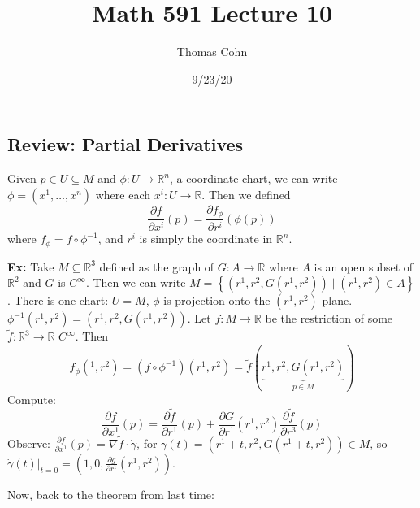 \documentclass[10pt,letterpaper]{article}
\author{Thomas Cohn}
\title{Math 591 Lecture 10}
\date{9/23/20} %
\newcommand{\n}{\hfill\break}
\newcommand{\nn}{\vspace{0.5\baselineskip}\n}
\newcommand{\hangblock}[2]{\par\noindent\settowidth{\hangindent}{\textbf{#1: }}\textbf{#1: }\!\!\!#2}
\newcommand{\ex}[1]{\hangblock{Ex}{#1}}
\newcommand{\set}[1]{\left\{#1\right\}}
\newcommand{\reals}{\mathbb{R}}
\newcommand{\R}{\reals}
\newcommand{\inv}{^{-1}}
\newcommand{\of}{\circ}
\newcommand{\restr}[2]{\left.#1\right|_{#2}}
\newcommand{\pd}[2]{\frac{\partial{}#1}{\partial{}#2}}
\newcommand{\del}{\nabla}
\begin{document}
\maketitle
\setlength\RaggedRightParindent{\parindent}
\RaggedRight

\subsection*{Review: Partial Derivatives}

\par\noindent
Given $p\in{}U\subseteq{}M$ and $\phi:U\to\R^{n}$, a coordinate chart, we can write $\phi=(x^{1},\ldots,x^{n})$ where each $x^{i}:U\to\R$. Then we defined
\[
	\pd{f}{x^{i}}(p)=\pd{f_{\phi}}{r^{i}}(\phi(p))
\]
where $f_{\phi}=f\of\phi\inv$, and $r^{i}$ is simply the coordinate in $\R^{n}$.\n

\ex{
	Take $M\subseteq\R^{3}$ defined as the graph of $G:A\to\R$ where $A$ is an open subset of $\R^{2}$ and $G$ is $C^{\infty}$. Then we can write $M=\set{(r^{1},r^{2},G(r^{1},r^{2}))\mid{}(r^{1},r^{2})\in{}A}$. There is one chart: $U=M$, $\phi$ is projection onto the $(r^{1},r^{2})$ plane. $\phi\inv(r^{1},r^{2})=(r^{1},r^{2},G(r^{1},r^{2}))$.\nn
	Let $f:M\to\R$ be the restriction of some $\tilde{f}:\R^{3}\to\R$ $C^{\infty}$. Then
	\[
		f_{\phi}(^{1},r^{2})=(f\of\phi\inv)(r^{1},r^{2})=\tilde{f}(\underbrace{r^{1},r^{2},G(r^{1},r^{2})}_{p\in{}M})
	\]
	Compute:
	\[
		\pd{f}{x^{1}}(p)=\pd{\tilde{f}}{r^{1}}(p)+\pd{G}{r^{1}}(r^{1},r^{2})\pd{\tilde{f}}{r^{3}}(p)
	\]
	Observe: $\pd{f}{x^{1}}(p)=\del\tilde{f}\cdot\dot\gamma$, for $\gamma(t)=(r^{1}+t,r^{2},G(r^{1}+t,r^{2}))\in{}M$, so $\restr{\dot\gamma(t)}{t=0}=(1,0,\pd{g}{r^{1}}(r^{1},r^{2}))$.\n
}

\par\noindent
Now, back to the theorem from last time:\n
\end{document}
